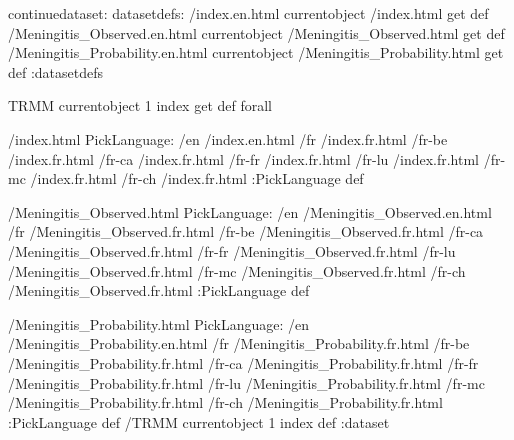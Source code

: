 \begin{ingrid}
continuedataset:
datasetdefs:
/index.en.html currentobject /index.html get def
/Meningitis_Observed.en.html currentobject /Meningitis_Observed.html get def
/Meningitis_Probability.en.html currentobject /Meningitis_Probability.html get def
:datasetdefs

{ TRMM } { currentobject 1 index get def } forall

/index.html {
PickLanguage:
/en /index.en.html
/fr /index.fr.html
/fr-be /index.fr.html
/fr-ca /index.fr.html
/fr-fr /index.fr.html
/fr-lu /index.fr.html
/fr-mc /index.fr.html
/fr-ch /index.fr.html
:PickLanguage
} def

/Meningitis_Observed.html {
PickLanguage:
/en /Meningitis_Observed.en.html
/fr /Meningitis_Observed.fr.html
/fr-be /Meningitis_Observed.fr.html
/fr-ca /Meningitis_Observed.fr.html
/fr-fr /Meningitis_Observed.fr.html
/fr-lu /Meningitis_Observed.fr.html
/fr-mc /Meningitis_Observed.fr.html
/fr-ch /Meningitis_Observed.fr.html
:PickLanguage
} def

/Meningitis_Probability.html {
PickLanguage:
/en /Meningitis_Probability.en.html
/fr /Meningitis_Probability.fr.html
/fr-be /Meningitis_Probability.fr.html
/fr-ca /Meningitis_Probability.fr.html
/fr-fr /Meningitis_Probability.fr.html
/fr-lu /Meningitis_Probability.fr.html
/fr-mc /Meningitis_Probability.fr.html
/fr-ch /Meningitis_Probability.fr.html
:PickLanguage
} def
/TRMM currentobject 1 index def
:dataset
\end{ingrid}
